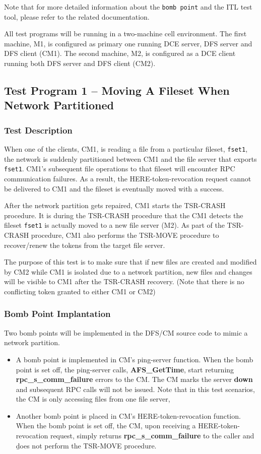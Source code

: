 Note that for more detailed information about the {\tt bomb point} and the 
ITL test tool, please refer to the related documentation.

All test programs will be running in a two-machine cell environment. The
first machine, M1, is configured as primary one running DCE server, DFS server
and DFS client (CM1). The second machine, M2, is configured as a DCE client
running both DFS server and DFS client (CM2).

\pagebreak 
\subsection {Test Program 1 -- Moving A Fileset When Network Partitioned}

\subsubsection {Test Description}

When one of the clients, CM1, is reading a file
from a particular fileset, {\tt fset1}, the network is suddenly partitioned 
between CM1 and the file server that exports {\tt fset1}. 
CM1's subsequent file operations to that fileset will encounter 
RPC communication failures. As a result, 
the HERE-token-revocation request cannot be delivered to CM1 and the fileset
is eventually moved with a success. 

After the network partition gets repaired, CM1 starts the TSR-CRASH
procedure. It is during the TSR-CRASH procedure that the CM1 
detects the fileset {\tt fset1} is actually moved to a new file server (M2). 
As part of the TSR-CRASH procedure, CM1 also performs the TSR-MOVE procedure
to recover/renew the tokens from the target file server. 

The purpose of this test is to make sure that if new files are created and
modified by CM2 while CM1 is isolated due to a network partition, new files
and changes will be visible to CM1 after the TSR-CRASH recovery. 
(Note that there is no conflicting token granted to either CM1 or CM2)


\subsubsection {Bomb Point Implantation}

Two bomb points will be implemented in the DFS/CM source code to mimic
a network partition.
\begin{itemize}
\item A bomb point is implemented in CM's ping-server function. When the bomb
point is set off, the ping-server calls, 
{\bf AFS_GetTime}, start returning 
{\bf rpc_s_comm_failure} errors to the CM. The CM marks the 
server {\bf down} and subsequent RPC calls will not be issued.
Note that in this test scenarios, the CM is only accessing files from one
file server, 
\item Another bomb point is placed in CM's HERE-token-revocation function. 
When the bomb point is set off, the CM, upon receiving a HERE-token-revocation
request, simply returns {\bf rpc_s_comm_failure} to the caller and
{\b does not} perform the TSR-MOVE procedure. 
\end{itemize}

